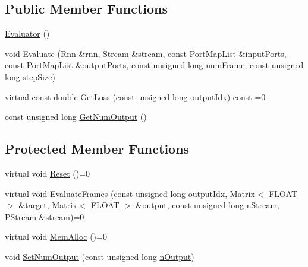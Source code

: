 \subsection*{Public Member Functions}
\begin{DoxyCompactItemize}
\item 
\hyperlink{classfractal_1_1Evaluator_a5f0c980a04028f0278f6d81780d1cef2}{Evaluator} ()
\item 
void \hyperlink{classfractal_1_1Evaluator_a66e573448393210cf678e564d0595879}{Evaluate} (\hyperlink{classfractal_1_1Rnn}{Rnn} \&rnn, \hyperlink{classfractal_1_1Stream}{Stream} \&stream, const \hyperlink{namespacefractal_a9697dee0746adccf37331470de749c2b}{Port\+Map\+List} \&input\+Ports, const \hyperlink{namespacefractal_a9697dee0746adccf37331470de749c2b}{Port\+Map\+List} \&output\+Ports, const unsigned long num\+Frame, const unsigned long step\+Size)
\item 
virtual const double \hyperlink{classfractal_1_1Evaluator_adefc2a02527a14868fed601bd6827525}{Get\+Loss} (const unsigned long output\+Idx) const =0
\item 
const unsigned long \hyperlink{classfractal_1_1Evaluator_a42d49a2c230f7fca213c0d65fde3538e}{Get\+Num\+Output} ()
\end{DoxyCompactItemize}
\subsection*{Protected Member Functions}
\begin{DoxyCompactItemize}
\item 
virtual void \hyperlink{classfractal_1_1Evaluator_a53ebcfd31f9742a6f0e8eec5556c6cd2}{Reset} ()=0
\item 
virtual void \hyperlink{classfractal_1_1Evaluator_a9bb323a73e59475ce155bb593911b0f7}{Evaluate\+Frames} (const unsigned long output\+Idx, \hyperlink{classfractal_1_1Matrix}{Matrix}$<$ \hyperlink{namespacefractal_a1c2d2530689575d5ccb56bae52af70d3}{F\+L\+O\+A\+T} $>$ \&target, \hyperlink{classfractal_1_1Matrix}{Matrix}$<$ \hyperlink{namespacefractal_a1c2d2530689575d5ccb56bae52af70d3}{F\+L\+O\+A\+T} $>$ \&output, const unsigned long n\+Stream, \hyperlink{classfractal_1_1PStream}{P\+Stream} \&stream)=0
\item 
virtual void \hyperlink{classfractal_1_1Evaluator_a52a8eb1bb6fd4d1194050479ecb31c65}{Mem\+Alloc} ()=0
\item 
void \hyperlink{classfractal_1_1Evaluator_a3251a42209e27f5c5e502b805cb8a58b}{Set\+Num\+Output} (const unsigned long \hyperlink{classfractal_1_1Evaluator_a2bfee4084662b6816c8c07c818f7482e}{n\+Output})
\end{DoxyCompactItemize}
